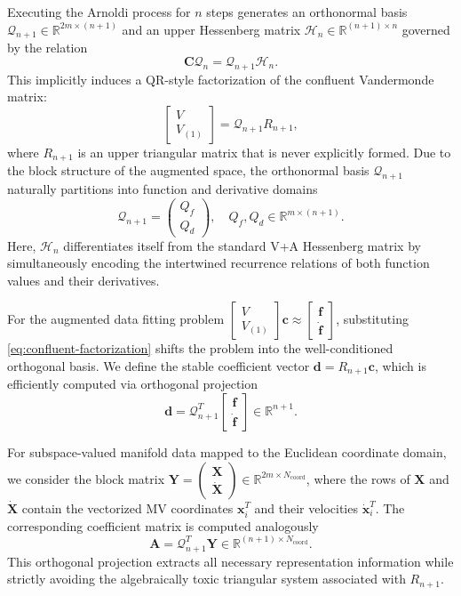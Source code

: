\documentclass[11pt]{article}
\begin{document}
Executing the Arnoldi process for $n$ steps generates an orthonormal basis $\mathcal{Q}_{n+1} \in \mathbb{R}^{2m \times (n+1)}$ and an upper Hessenberg matrix $\mathcal{H}_n \in \mathbb{R}^{(n+1) \times n}$ governed by the relation
 $$
\mathbf{C} \mathcal{Q}_n = \mathcal{Q}_{n+1} \mathcal{H}_n.  $$
This implicitly induces a QR-style factorization of the confluent Vandermonde matrix:
\begin{equation}
\begin{bmatrix} V \\ V_{(1)} \end{bmatrix} = \mathcal{Q}_{n+1} R_{n+1}, \label{eq:confluent-factorization}
\end{equation}
where $R_{n+1}$ is an upper triangular matrix that is never explicitly formed. Due to the block structure of the augmented space, the orthonormal basis $\mathcal{Q}_{n+1}$ naturally partitions into function and derivative domains
$$
\mathcal{Q}_{n+1} = \begin{pmatrix} Q_f \\ Q_d \end{pmatrix}, \quad Q_f, Q_d \in \mathbb{R}^{m \times (n+1)}.   $$ 
Here, $\mathcal{H}_n$ differentiates itself from the standard V+A Hessenberg matrix by simultaneously encoding the intertwined recurrence relations of both function values and their derivatives.

For the augmented data fitting problem $\begin{bmatrix} V \\ V_{(1)} \end{bmatrix} \mathbf{c} \approx \begin{bmatrix} \mathbf{f} \\ \dot{\mathbf{f}} \end{bmatrix}$, substituting \eqref{eq:confluent-factorization} shifts the problem into the well-conditioned orthogonal basis. We define the stable coefficient vector $\mathbf{d} = R_{n+1}\mathbf{c}$, which is efficiently computed via orthogonal projection
 $$
\mathbf{d} = \mathcal{Q}_{n+1}^T \begin{bmatrix} \mathbf{f} \\ \dot{\mathbf{f}} \end{bmatrix} \in \mathbb{R}^{n+1}. $$

For subspace-valued manifold data mapped to the Euclidean coordinate domain, we consider the block matrix $\mathbf{Y} = \begin{pmatrix} \mathbf{X} \\ \dot{\mathbf{X}} \end{pmatrix} \in \mathbb{R}^{2m \times N_{\text{coord}}}$, where the rows of $\mathbf{X}$ and $\dot{\mathbf{X}}$ contain the vectorized MV coordinates $\mathbf{x}_i^T$ and their velocities $\dot{\mathbf{x}}_i^T$. The corresponding coefficient matrix is computed analogously
 $$
\mathbf{A} = \mathcal{Q}_{n+1}^T \mathbf{Y} \in \mathbb{R}^{(n+1) \times N_{\text{coord}}}.  $$
This orthogonal projection extracts all necessary representation information while strictly avoiding the algebraically toxic triangular system associated with $R_{n+1}$.
\end{document}
